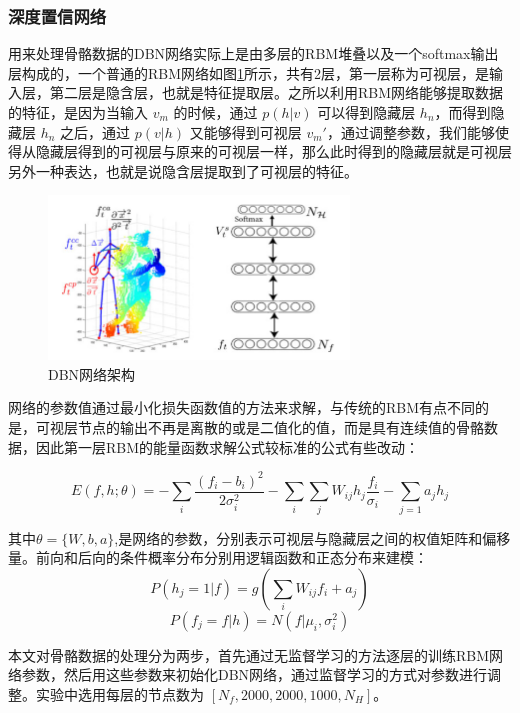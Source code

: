 \documentclass[a4paper, 12pt]{article}
\begin{document}
\subsubsection{深度置信网络}
用来处理骨骼数据的DBN网络实际上是由多层的RBM堆叠以及一个softmax输出层构成的，一个普通的RBM网络如图\ref{fig:rbn}所示，共有2层，第一层称为可视层，是输入层，第二层是隐含层，也就是特征提取层。之所以利用RBM网络能够提取数据的特征，是因为当输入 $v_m$ 的时候，通过 $p(h|v)$ 可以得到隐藏层 $h_n$，而得到隐藏层 $h_n$ 之后，通过 $p(v|h)$ 又能够得到可视层 $v_m'$，通过调整参数，我们能够使得从隐藏层得到的可视层与原来的可视层一样，那么此时得到的隐藏层就是可视层另外一种表达，也就是说隐含层提取到了可视层的特征。
\begin{figure}[ht]
  \centering
  \includegraphics[width=8cm]{DBN.png}
  \caption{\label{fig:rbn}DBN网络架构}
\end{figure}

网络的参数值通过最小化损失函数值的方法来求解，与传统的RBM有点不同的是，可视层节点的输出不再是离散的或是二值化的值，而是具有连续值的骨骼数据，因此第一层RBM的能量函数求解公式较标准的公式有些改动：

\begin{equation}
  E(f,h;\theta) = -\sum_i{\frac{(f_i-b_i)^2}{2\sigma_i^2}} - \sum_i{}\sum_j{W_{ij}h_j\frac{f_i}{\sigma_i}} - \sum_{j=1}{a_jh_j}
\end{equation}

其中$\theta=\{W,b,a\}$,是网络的参数，分别表示可视层与隐藏层之间的权值矩阵和偏移量。前向和后向的条件概率分布分别用逻辑函数和正态分布来建模：
\begin{equation}
  P(h_j=1|f) = g(\sum_i{W_{ij}f_i+a_j})
\end{equation}
\begin{equation}
  P(f_j=f|h) = N(f|\mu_i,\sigma^2_i)
\end{equation}


本文对骨骼数据的处理分为两步，首先通过无监督学习的方法逐层的训练RBM网络参数，然后用这些参数来初始化DBN网络，通过监督学习的方式对参数进行调整。实验中选用每层的节点数为 $[N_f,2000,2000,1000,N_H]$。
\end{document}
